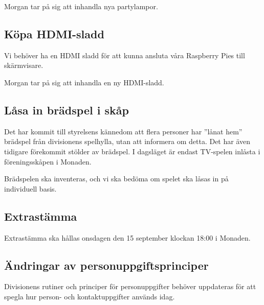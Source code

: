 \documentclass[protokoll]{dvd}
\begin{document}
\begin{beslut}
    \item Morgan tar på sig att inhandla nya partylampor.
\end{beslut}

\subsection{Köpa HDMI-sladd}

Vi behöver ha en HDMI sladd för att kunna ansluta våra Raspberry Pies till skärmvisare.

\begin{beslut}
    \item Morgan tar på sig att inhandla en ny HDMI-sladd.
\end{beslut}

\subsection{Låsa in brädspel i skåp}

Det har kommit till styrelsens kännedom att flera personer har ''lånat hem'' brädspel från divisionens spelhylla, utan att informera om detta.
Det har även tidigare förekommit stölder av brädspel.
I dagsläget är endast TV-spelen inlåsta i föreningsskåpen i Monaden.

\begin{beslut}
    \item Brädspelen ska inventeras, och vi ska bedöma om spelet ska låsas in på individuell basis.
\end{beslut}

\subsection{Extrastämma}

\begin{beslut}
    \item Extrastämma ska hållas onsdagen den 15 september klockan 18:00 i Monaden.
\end{beslut}

\subsection{Ändringar av personuppgiftsprinciper}

Divisionens rutiner och principer för personuppgifter behöver uppdateras för att spegla hur person- och kontaktuppgifter används idag.
\end{document}
